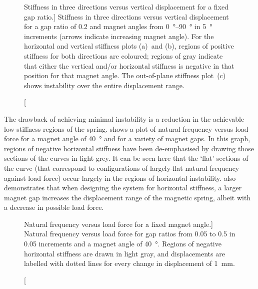 \documentclass[11pt,a4paper]{memoir}
\begin{document}
\begin{figure}
\begin{wide}
\hspace{-1cm}
%
%
%
\end{wide}
\caption
[Stiffness in three directions versus vertical displacement for a fixed gap ratio.]
{Stiffness in three directions versus vertical displacement for a gap ratio of \num{0.2} and magnet angles from \SIrange{0}{90}{\degree} in \SI{5}{\degree} increments (arrows indicate increasing magnet angle).
For the horizontal and vertical stiffness plots (a)~and (b), regions of positive stiffness for both directions are coloured; regions of gray indicate that either the vertical and/or horizontal stiffness is negative in that position for that magnet angle.
The out-of-plane stiffness plot~(c) shows instability over the entire displacement range.
}
\end{figure}

The drawback of achieving minimal instability is a reduction in the achievable low-stiffness regions of the spring.
 shows a plot of natural frequency versus load force for a magnet angle of \SI{40}{\degree} and for a variety of magnet gaps.
In this graph, regions of negative horizontal stiffness have been de-emphasised by drawing those sections of the curves in light grey.
It can be seen here that the `flat' sections of the curve (that correspond to configurations of largely-flat natural frequency against load force) occur largely in the regions of horizontal instability.
 also demonstrates that when designing the system for horizontal stiffness, a larger magnet gap increases the displacement range of the magnetic spring, albeit with a decrease in possible load force.

\begin{figure}
\centering
{}
\caption
[Natural frequency versus load force for a fixed magnet angle.]
{Natural frequency versus load force for gap ratios from \num{0.05} to \num{0.5} in \num{0.05} increments and a magnet angle of \SI{40}{\degree}.
Regions of negative horizontal stiffness are drawn in light gray, and displacements are labelled with dotted lines for every change in displacement of \SI{1}{mm}.}
\end{figure}
\end{document}
